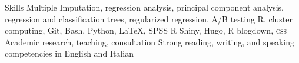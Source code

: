 
\begin{rubric}{Skills}
Multiple Imputation, regression analysis, principal component analysis, regression and classification trees, regularized regression, A/B testing
R, cluster computing, Git, Bash, Python, \LaTeX, SPSS
R Shiny, Hugo, R blogdown, \textsc{css}
\entry*[Misc.]
Academic research, teaching, consultation
\entry*[Languages]
	Strong reading, writing, and speaking competencies in English and Italian
\end{rubric}
